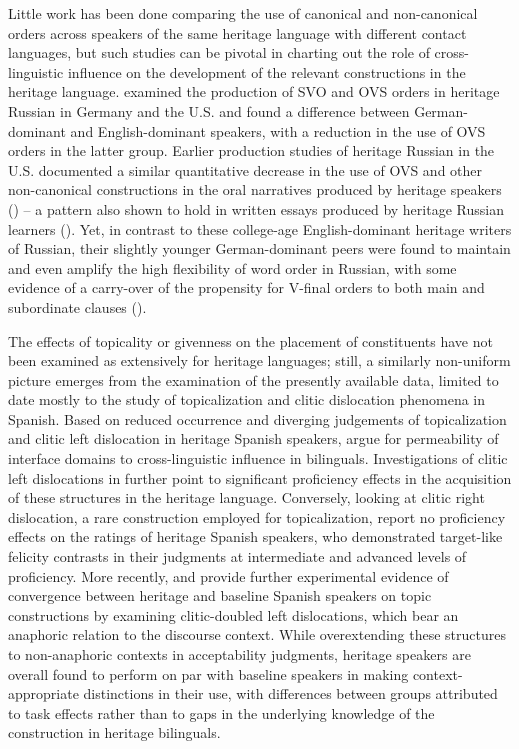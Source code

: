 \documentclass[output=paper]{langscibook}
\begin{document}
Little work has been done comparing the use of canonical and non-canonical orders across speakers of the same heritage language with different contact languages, but such studies can be pivotal in charting out the role of cross-linguistic influence on the development of the relevant constructions in the heritage language. \citet{ZubanEtAl2021} examined the production of SVO and OVS orders in heritage Russian in Germany and the U.S. and found a difference between German-dominant and English-dominant speakers, with a reduction in the use of OVS orders in the latter group. Earlier production studies of heritage Russian in the U.S. documented a similar quantitative decrease in the use of OVS and other non-canonical constructions in the oral narratives produced by heritage speakers (\citealt{IsurinIvanovaSullivan2008, Ivanova-Sullivan2014, LalekoDubinina2018, Polinsky2008Heritage}) – a pattern also shown to hold in written essays produced by heritage Russian learners (\citealt{Kisselev2019}). Yet, in contrast to these college-age English-dominant heritage writers of Russian, their slightly younger German-dominant peers were found to maintain and even amplify the high flexibility of word order in Russian, with some evidence of a carry-over of the propensity for V-final orders to both main and subordinate clauses (\citealt{BrehmerUsanova2015}).

The effects of topicality or givenness on the placement of constituents have not been examined as extensively for heritage languages; still, a similarly non-uniform picture emerges from the examination of the presently available data, limited to date mostly to the study of topicalization and clitic dislocation phenomena in Spanish. Based on reduced occurrence and diverging judgements of topicalization and clitic left dislocation in heritage Spanish speakers, \citet{ZapataToribio2005} argue for permeability of interface domains to cross-linguistic influence in bilinguals. Investigations of clitic left dislocations in \citet{Montrul2010Dominant, Montrul2010How} further point to significant proficiency effects in the acquisition of these structures in the heritage language. Conversely, looking at clitic right dislocation, a rare construction employed for topicalization,  \citet{LealSlabakova2014} report no proficiency effects on the ratings of heritage Spanish speakers, who demonstrated target-like felicity contrasts in their judgments at intermediate and advanced levels of proficiency. More recently,  \citet{LealMéndezSlabakova2015} and \citet{Sequeros-ValleCabrelli2020} provide further experimental evidence of convergence between heritage and baseline Spanish speakers on topic constructions by examining clitic-doubled left dislocations, which bear an anaphoric relation to the discourse context. While overextending these structures to non-anaphoric contexts in acceptability judgments, heritage speakers are overall found to perform on par with baseline speakers in making context-appropriate distinctions in their use, with differences between groups attributed to task effects rather than to gaps in the underlying knowledge of the construction in heritage bilinguals.
\end{document}
